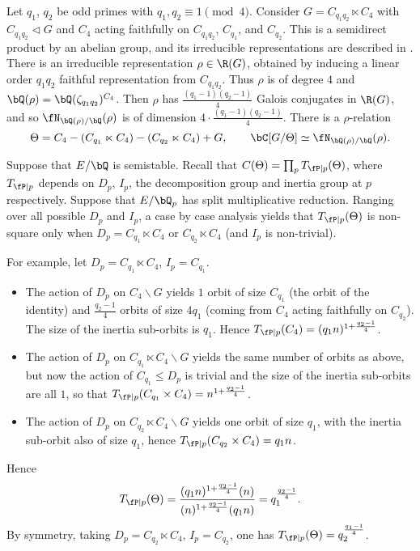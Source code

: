 \begin{example}
    Let $q_1$, $q_2$ be odd primes with $q_1, q_2 \equiv 1 \pmod 4$. Consider $G = C_{q_1 q_2} \ltimes C_4$ with $C_{q_1 q_2} \triangleleft G$ and $C_4$ acting faithfully on $C_{q_1 q_2}$, $C_{q_1}$, and $C_{q_2}$. This is a semidirect product by an abelian group, and its irreducible representations are described in \cite[Chapter 8, \S8.2]{Serre}. There is an irreducible representation $\rho \in \R(G)$, obtained by inducing a linear order $q_1 q_2$ faithful representation from $C_{q_1 q_2}$. Thus $\rho$ is of degree $4$ and $\bQ(\rho) = \bQ(\zeta_{q_1 q_2})^{C_4}$. Then $\rho$ has $\frac{(q_1 - 1)(q_2 - 1)}{4}$ Galois conjugates in $\R(G)$, and so $\repnorm{\rho}$ is of dimension $4 \cdot \frac{(q_1 - 1)(q_2 - 1)}{4}$. There is a $\rho$-relation $$\Theta = C_4 - (C_{q_1} \ltimes C_4) - (C_{q_2} \ltimes C_4) + G, \qquad \bC[G / \Theta] \simeq \repnorm{\rho}.$$ 

    Suppose that $E / \bQ$ is semistable. Recall that $C(\Theta) = \prod_p T_{\fP \mid p}(\Theta)$, where $T_{\fP \mid p}$ depends on $D_p$, $I_p$, the decomposition group and inertia group at $p$ respectively. Suppose that $E / \bQ_p$ has split multiplicative reduction. Ranging over all possible $D_p$ and $I_p$, a case by case analysis yields that $T_{\fP \mid p}(\Theta)$ is non-square only when $D_p = C_{q_1} \ltimes C_4$ or $C_{q_2} \ltimes C_4$ (and $I_p$ is non-trivial). 

    For example, let $D_p = C_{q_1} \ltimes C_4$, $I_p = C_{q_1}$.
        \begin{itemize}[--]
            \setlength\itemsep{0em}
            \item The action of $D_p$ on $C_4 \backslash G$ yields $1$ orbit of size $C_{q_1}$ (the orbit of the identity) and $\frac{q_2 - 1}{4}$ orbits of size $4q_1$ (coming from $C_4$ acting faithfully on $C_{q_2}$). The size of the inertia sub-orbits is $q_1$. Hence $T_{\fP \mid p}(C_4) = (q_1 n)^{1 + \frac{q_2 - 1}{4}}$.
            \item The action of $D_p$ on $C_{q_1} \ltimes C_4 \backslash G$ yields the same number of orbits as above, but now the action of $C_{q_1} \leq D_p$ is trivial and the size of the inertia sub-orbits are all $1$, so that $T_{\fP \mid p}(C_{q_1} \times C_4) = n^{1 + \frac{q_2 - 1}{4}}$.
            \item The action of $D_p$ on $C_{q_2} \ltimes C_4 \backslash G$ yields one orbit of size $q_1$, with the inertia sub-orbit also of size $q_1$, hence $T_{\fP \mid p}(C_{q_2} \times C_4) = q_1 n$.
        \end{itemize}
    Hence
    \[ T_{\fP \mid p}(\Theta) = \frac{(q_1 n )^{1 + \frac{q_2 - 1}{4}} (n)}{(n)^{1 + \frac{q_2 - 1}{4}} (q_1 n)} = q_1^{\frac{q_2 - 1}{4}} .\] 
    By symmetry, taking $D_p = C_{q_2} \ltimes C_4$, $I_p = C_{q_2}$, one has $T_{\fP \mid p}(\Theta) = q_2^{\frac{q_1 - 1}{4}}$.


\end{example}
